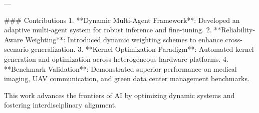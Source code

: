---

### Contributions
1. **Dynamic Multi-Agent Framework**: Developed an adaptive multi-agent system for robust inference and fine-tuning.
2. **Reliability-Aware Weighting**: Introduced dynamic weighting schemes to enhance cross-scenario generalization.
3. **Kernel Optimization Paradigm**: Automated kernel generation and optimization across heterogeneous hardware platforms.
4. **Benchmark Validation**: Demonstrated superior performance on medical imaging, UAV communication, and green data center management benchmarks.

This work advances the frontiers of AI by optimizing dynamic systems and fostering interdisciplinary alignment.